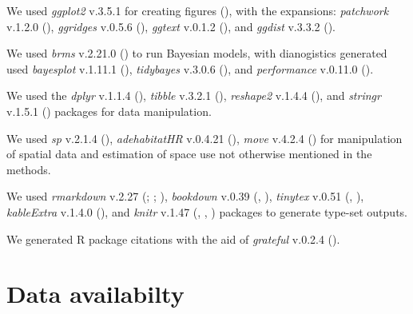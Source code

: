 \documentclass[10pt,a4paper]{article}
\begin{document}
We used \emph{ggplot2} v.3.5.1 for creating figures (), with the expansions: \emph{patchwork} v.1.2.0 (), \emph{ggridges} v.0.5.6 (), \emph{ggtext} v.0.1.2 (), and \emph{ggdist} v.3.3.2 ().

We used \emph{brms} v.2.21.0 () to run Bayesian models, with dianogistics generated used \emph{bayesplot} v.1.11.1 (), \emph{tidybayes} v.3.0.6 (), and \emph{performance} v.0.11.0 ().

We used the \emph{dplyr} v.1.1.4 (), \emph{tibble} v.3.2.1 (), \emph{reshape2} v.1.4.4 (), and \emph{stringr} v.1.5.1 () packages for data manipulation.

We used \emph{sp} v.2.1.4 (), \emph{adehabitatHR} v.0.4.21 (), \emph{move} v.4.2.4 () for manipulation of spatial data and estimation of space use not otherwise mentioned in the methods.

We used \emph{rmarkdown} v.2.27 (; ; ), \emph{bookdown} v.0.39 (, ), \emph{tinytex} v.0.51 (, ), \emph{kableExtra} v.1.4.0 (), and \emph{knitr} v.1.47 (, , ) packages to generate type-set outputs.

We generated R package citations with the aid of \emph{grateful} v.0.2.4 ().

\section{Data availabilty}\label{data-availabilty}
\end{document}
